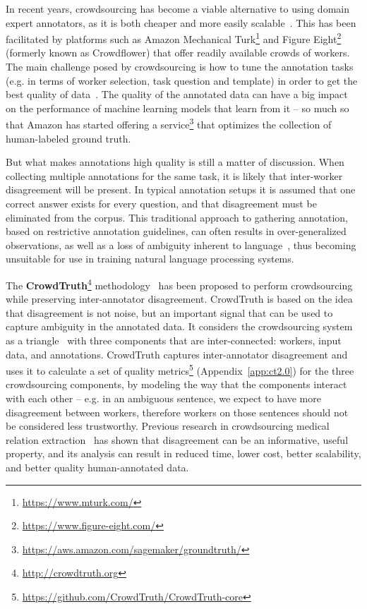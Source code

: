 In recent years, crowdsourcing has become a viable alternative to using domain expert annotators, as it is both cheaper and more easily scalable~\cite{Sabou:2012:CRO:2362456.2362479}. This has been facilitated by platforms such as Amazon Mechanical Turk\footnote{\url{https://www.mturk.com/}} and Figure Eight\footnote{\url{https://www.figure-eight.com/}} (formerly known as Crowdflower) that offer readily available crowds of workers. The main challenge posed by crowdsourcing is how to tune the annotation tasks (e.g. in terms of worker selection, task question and template) in order to get the best quality of data~\cite{Difallah2012}. The quality of the annotated data can have a big impact on the performance of machine learning models that learn from it -- so much so that Amazon has started offering a service\footnote{\url{https://aws.amazon.com/sagemaker/groundtruth/}} that optimizes the collection of human-labeled ground truth.

But what makes annotations high quality is still a matter of discussion. When collecting multiple annotations for the same task, it is likely that inter-worker disagreement will be present. In typical annotation setups it is assumed that one correct answer exists for every question, and that disagreement must be eliminated from the corpus. This traditional approach to gathering annotation, based on restrictive annotation guidelines, can often results in over-generalized observations, as well as a loss of ambiguity inherent to language~\cite{aroyo2012harnessing}, thus becoming unsuitable for use in training natural language processing systems. %

The \textbf{CrowdTruth}\footnote{\url{http://crowdtruth.org}} methodology~\cite{aroyo2015truth,aroyo2013crowd,inel2013} has been proposed to perform crowdsourcing while preserving inter-annotator disagreement. CrowdTruth is based on the idea~\cite{aroyo2015truth} that disagreement is not noise, but an important signal that can be used to capture ambiguity in the annotated data. It considers the crowdsourcing system as a triangle~\cite{aroyo2014threesides} with three components that are inter-connected: workers, input data, and annotations. CrowdTruth captures inter-annotator disagreement and uses it to calculate a set of quality metrics\footnote{\url{https://github.com/CrowdTruth/CrowdTruth-core}} (Appendix~\ref{app:ct2.0}) for the three crowdsourcing components, by modeling the way that the components interact with each other -- e.g. in an ambiguous sentence, we expect to have more disagreement between workers, therefore workers on those sentences should not be considered less trustworthy. Previous research in crowdsourcing medical relation extraction~\cite{aroyo2013crowd,aroyo2013measuring} has shown that disagreement can be an informative, useful property, and its analysis can result in reduced time, lower cost, better scalability, and better quality human-annotated data.

